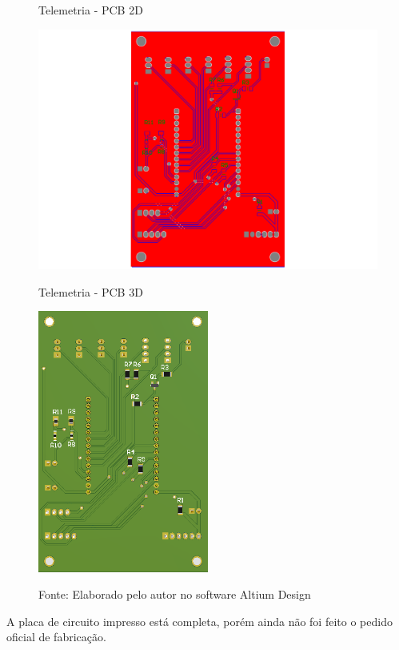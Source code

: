 \documentclass[../delivery_hospital_report.tex]{subfiles}
\begin{document}
\begin{figure}[!h]
    \centering
    \begin{minipage}{0.5\textwidth}
        \centering
        \caption{Telemetria - PCB 2D}
        \includegraphics[width=1.03\textwidth]{modulos/Telemetria_Oficial-5.png} 
        \label{fig:figura1minipg}
    \end{minipage}\hfill
    \begin{minipage}{0.5\textwidth}
        \centering
        \caption{Telemetria - PCB 3D}
        \includegraphics[width=0.5\textwidth]{modulos/Telemetria_Oficial.png} 
        \label{fig:figura1minipg}
    \end{minipage}\hfill
    
    \caption*{Fonte: Elaborado pelo autor no software Altium Design\cite{altium21} }
    \label{fig:figurasminipg}
\end{figure}

A placa de circuito impresso está completa, porém ainda não foi feito o pedido oficial de fabricação.

\end{document}
